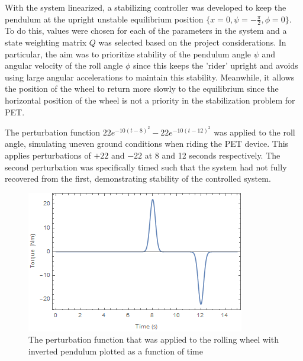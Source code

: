 With the system linearized, a stabilizing controller was developed to keep the pendulum at the upright unstable equilibrium position $\{x=0,\psi=-\frac{\pi}{2},\phi=0\}$. To do this, values were chosen for each of the parameters in the system and a state weighting matrix $Q$ was selected based on the project considerations. In particular, the aim was to prioritize stability of the pendulum angle $\psi$ and angular velocity of the roll angle $\phi$ since this keeps the 'rider' upright and avoids using large angular accelerations to maintain this stability. Meanwhile, it allows the position of the wheel to return more slowly to the equilibrium since the horizontal position of the wheel is not a priority in the stabilization problem for PET.

The perturbation function $22 e^{-10 (t-8)^2}-22 e^{-10 (t-12)^2}$ was applied to the roll angle, simulating uneven ground conditions when riding the PET device. This applies perturbations of $+22$ and $-22$ at 8 and 12 seconds respectively. The second perturbation was specifically timed such that the system had not fully recovered from the first, demonstrating stability of the controlled system.
\par

\begin{figure}[!htb]
	\centering
	\includegraphics[width=\linewidth]{perturbation.png}
	\endminipage\hspace{1em}%
	\caption{The perturbation function that was applied to the rolling wheel with inverted pendulum plotted as a function of time}\label{fig:perturb}
\end{figure}

